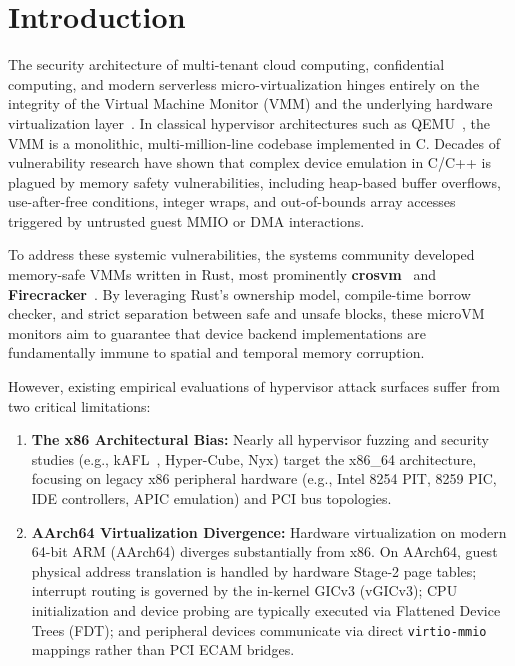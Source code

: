 \documentclass{article}
\begin{document}
\section{Introduction}\label{sec:intro}

The security architecture of multi-tenant cloud computing, confidential computing, and modern serverless micro-virtualization hinges entirely on the integrity of the Virtual Machine Monitor (VMM) and the underlying hardware virtualization layer~\cite{agache2020firecracker,kivity2007kvm}. In classical hypervisor architectures such as QEMU~\cite{bellard2005qemu}, the VMM is a monolithic, multi-million-line codebase implemented in C. Decades of vulnerability research have shown that complex device emulation in C/C++ is plagued by memory safety vulnerabilities, including heap-based buffer overflows, use-after-free conditions, integer wraps, and out-of-bounds array accesses triggered by untrusted guest MMIO or DMA interactions.

To address these systemic vulnerabilities, the systems community developed memory-safe VMMs written in Rust, most prominently \textbf{crosvm}~\cite{crosvm} and \textbf{Firecracker}~\cite{agache2020firecracker}. By leveraging Rust's ownership model, compile-time borrow checker, and strict separation between safe and unsafe blocks, these microVM monitors aim to guarantee that device backend implementations are fundamentally immune to spatial and temporal memory corruption.

However, existing empirical evaluations of hypervisor attack surfaces suffer from two critical limitations:
\begin{enumerate}[leftmargin=*]
    \item \textbf{The x86 Architectural Bias:} Nearly all hypervisor fuzzing and security studies (e.g., kAFL~\cite{schumilo2017kafl}, Hyper-Cube, Nyx) target the x86\_64 architecture, focusing on legacy x86 peripheral hardware (e.g., Intel 8254 PIT, 8259 PIC, IDE controllers, APIC emulation) and PCI bus topologies.
    \item \textbf{AArch64 Virtualization Divergence:} Hardware virtualization on modern 64-bit ARM (AArch64) diverges substantially from x86. On AArch64, guest physical address translation is handled by hardware Stage-2 page tables; interrupt routing is governed by the in-kernel GICv3 (vGICv3); CPU initialization and device probing are typically executed via Flattened Device Trees (FDT); and peripheral devices communicate via direct \texttt{virtio-mmio} mappings rather than PCI ECAM bridges.
\end{enumerate}
\end{document}
